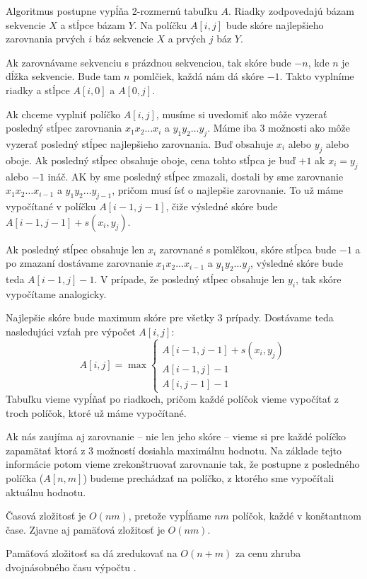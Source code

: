Algoritmus postupne vypĺňa 2-rozmernú tabuľku $A$. Riadky zodpovedajú bázam sekvencie $X$ a stĺpce bázam $Y$. Na políčku $A[i,j]$ bude skóre najlepšieho zarovnania prvých $i$ báz sekvencie $X$ a prvých $j$ báz $Y$.

Ak zarovnávame sekvenciu s prázdnou sekvenciou, tak skóre bude $-n$, kde $n$ je dĺžka sekvencie. Bude tam $n$ pomlčiek, každá nám dá skóre $-1$. Takto vyplníme riadky a stĺpce $A[i,0]$ a $A[0,j]$.

Ak chceme vyplniť políčko $A[i,j]$, musíme si uvedomiť ako môže vyzerať posledný stĺpec zarovnania $x_1x_2\dots x_i$ a $y_1y_2\dots y_j$. Máme iba 3 možnosti ako môže vyzerať posledný stĺpec najlepšieho zarovnania. Buď obsahuje $x_i$ alebo $y_j$ alebo oboje. Ak posledný stĺpec obsahuje oboje, cena tohto stĺpca je buď $+1$ ak $x_i = y_j$ alebo $-1$ ináč. AK by sme posledný stĺpec zmazali, dostali by sme zarovnanie $x_1x_2\dots x_{i-1}$ a $y_1y_2\dots y_{j-1}$, pričom musí ísť o najlepšie zarovnanie. To už máme vypočítané v políčku $A[i-1, j-1]$, čiže výsledné skóre bude $A[i-1, j-1] + s(x_i,y_j)$.

Ak posledný stĺpec obsahuje len $x_i$ zarovnané s pomlčkou, skóre stĺpca bude $-1$ a po zmazaní dostávame zarovnanie $x_1x_2\dots x_{i-1}$ a $y_1y_2\dots y_{j}$, výsledné skóre bude teda $A[i-1, j] -1$. V prípade, že posledný stĺpec obsahuje len $y_i$, tak skóre vypočítame analogicky.

Najlepšie skóre bude maximum skóre pre všetky 3 prípady.
Dostávame teda nasledujúci vzťah pre výpočet $A[i,j]$:
$$A[i,j] = \max \left\{ 
\begin{array}{l}
A[i-1,j-1]+s(x_i, y_j)\\ 
A[i-1,j]-1\\
A[i,j-1]-1 
\end{array} \right.$$
Tabuľku vieme vypĺňať po riadkoch, pričom každé políčok vieme vypočítať z troch políčok, ktoré už máme vypočítané. 

Ak nás zaujíma aj zarovnanie -- nie len jeho skóre -- vieme si pre každé políčko zapamätať ktorá z 3 možností dosiahla maximálnu hodnotu. Na základe tejto informácie potom vieme zrekonštruovať zarovnanie tak, že postupne z posledného políčka ($A[n,m]$) budeme prechádzať na políčko, z ktorého sme vypočítali aktuálnu hodnotu.

Časová zložitosť je $O(nm)$, pretože vypĺňame $nm$ políčok, každé v konštantnom čase. Zjavne aj pamäťová zložitosť je $O(nm)$.

Pamäťová zložitosť sa dá zredukovať na $O(n+m)$ za cenu zhruba dvojnásobného času výpočtu \cite{hirschberg}.

